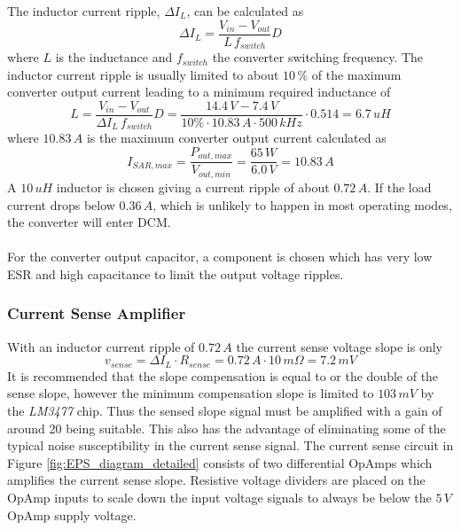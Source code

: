 \noindent
The inductor current ripple, $\Delta I_L$, can be calculated as 
%
\begin{equation}
\Delta I_L=\dfrac{V_{in}-V_{out}}{L\,f_{switch}}D
\end{equation}
%
where $L$ is the inductance and $f_{switch}$ the converter switching frequency. 
The inductor current ripple is usually limited to about $10\,\%$ of the maximum converter output current leading to a minimum required inductance of
%
\begin{equation}
L=\dfrac{V_{in}-V_{out}}{\Delta I_L\,f_{switch}}D=\dfrac{14.4\,V-7.4\,V}{10\% \cdot 10.83\,A\cdot 500\,kHz}\cdot 0.514=6.7\,uH
\end{equation}
%
where $10.83\,A$ is the maximum converter output current calculated as 
%
\begin{equation}
I_{SAR,max}=\dfrac{P_{out,max}}{V_{out,min}}=\dfrac{65\,W}{6.0\,V}=10.83\,A
\end{equation}
%
A $10\,uH$ inductor is chosen giving a current ripple of about $0.72\,A$. If the load current drops below $0.36\,A$, which is unlikely to happen in most operating modes, the converter will enter \ac{DCM}.
\\
\\
For the converter output capacitor, a component is chosen which has very low \ac{ESR} and high capacitance to limit the output voltage ripples.
%
\subsubsection*{Current Sense Amplifier}
With an inductor current ripple of $0.72\,A$ the current sense voltage slope is only 
%
\begin{equation}
v_{sense}=\Delta I_L\cdot R_{sense}=0.72\,A\cdot 10\,m\Omega = 7.2\,mV
\end{equation}
%
It is recommended that the slope compensation is equal to or the double of the sense slope\cite[sec. 12-1]{Fundamentals}, however the minimum compensation slope is limited to $103\,mV$ by the \textit{LM3477} chip. Thus the sensed slope signal must be amplified with a gain of around 20 being suitable. This also has the advantage of eliminating some of the typical noise susceptibility in the current sense signal. The current sense circuit in Figure \ref{fig:EPS_diagram_detailed} consists of two differential OpAmps which amplifies the current sense slope. Resistive voltage dividers are placed on the OpAmp inputs to scale down the input voltage signals to always be below the $5\,V$ OpAmp supply voltage.

